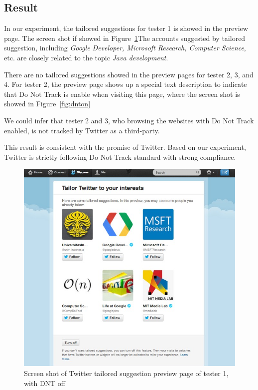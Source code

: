 \documentclass{sig-alternate}
\begin{document}
\subsection{Result} \label{sec:result}

In our experiment, the tailored suggestions for tester 1 is showed in the preview page. The screen shot if showed in Figure~\ref{fig:twitter}The accounts suggested by tailored suggestion, including \emph{Google Developer, Microsoft Research, Computer Science}, etc. are closely related to the topic \emph{Java development}. 

There are no tailored suggestions showed in the preview pages for tester 2, 3, and 4. For tester 2, the preview page shows up a special text description to indicate that Do Not Track is enable when visiting this page, where the screen shot is showed in Figure~\ref{fig:dnton}

We could infer that tester 2 and 3, who browsing the websites with Do Not Track enabled, is not tracked by Twitter as a third-party.

This result is consistent with the promise of Twitter. Based on our experiment, Twitter is strictly following Do Not Track standard with strong compliance.
\begin{figure}
\begin{center}
\includegraphics[width=0.9\columnwidth]{twitter}
\end{center}
\caption{Screen shot of Twitter tailored suggestion preview page of tester 1, with DNT off}
\label{fig:twitter}
\end{figure}
\end{document}
